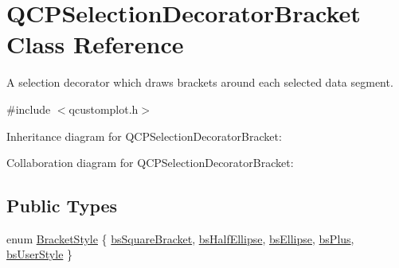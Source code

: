 \hypertarget{class_q_c_p_selection_decorator_bracket}{}\section{Q\+C\+P\+Selection\+Decorator\+Bracket Class Reference}
\label{class_q_c_p_selection_decorator_bracket}


A selection decorator which draws brackets around each selected data segment.  




{\ttfamily \#include $<$qcustomplot.\+h$>$}



Inheritance diagram for Q\+C\+P\+Selection\+Decorator\+Bracket\+:


Collaboration diagram for Q\+C\+P\+Selection\+Decorator\+Bracket\+:
\subsection*{Public Types}
\begin{DoxyCompactItemize}
\item 
enum \hyperlink{class_q_c_p_selection_decorator_bracket_aa6d18517ec0553575bbef0de4252336e}{Bracket\+Style} \{ \newline
\hyperlink{class_q_c_p_selection_decorator_bracket_aa6d18517ec0553575bbef0de4252336eaa10a8d25d409b09256a13220a4d74f81}{bs\+Square\+Bracket}, 
\hyperlink{class_q_c_p_selection_decorator_bracket_aa6d18517ec0553575bbef0de4252336eafa8ad19b1822c9c03fbe5e9ff8eeeea2}{bs\+Half\+Ellipse}, 
\hyperlink{class_q_c_p_selection_decorator_bracket_aa6d18517ec0553575bbef0de4252336ea7cab0f2f406e293094a7a1e4903f6e8c}{bs\+Ellipse}, 
\hyperlink{class_q_c_p_selection_decorator_bracket_aa6d18517ec0553575bbef0de4252336ea86eb6ae27e6296576fdc46d13c840530}{bs\+Plus}, 
\newline
\hyperlink{class_q_c_p_selection_decorator_bracket_aa6d18517ec0553575bbef0de4252336ea5a627cacdaa30ce434371d6a034b991d}{bs\+User\+Style}
 \}
\end{DoxyCompactItemize}
